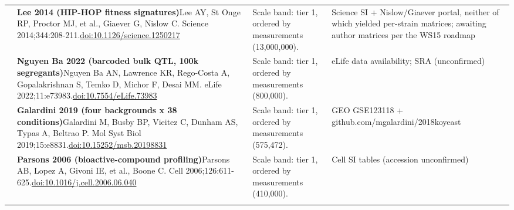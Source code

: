 \begin{landscape}
\begin{longtable}{@{}r@{\hspace{4pt}} L{86mm} L{92mm} L{62mm}@{}}
 & \textbf{Lee 2014 (HIP-HOP fitness signatures)}\newline Lee AY, St Onge RP, Proctor MJ, et al., Giaever G, Nislow C. Science 2014;344:208-211.\newline \href{https://doi.org/10.1126/science.1250217}{doi:10.1126/\allowbreak science.1250217} & Scale band: tier 1, ordered by measurements (13,000,000). & Science SI + Nislow/\allowbreak Giaever portal, neither of which yielded per-strain matrices; awaiting author matrices per the WS15 roadmap \\
 & \textbf{Nguyen Ba 2022 (barcoded bulk QTL, 100k segregants)}\newline Nguyen Ba AN, Lawrence KR, Rego-Costa A, Gopalakrishnan S, Temko D, Michor F, Desai MM. eLife 2022;11:e73983.\newline \href{https://doi.org/10.7554/eLife.73983}{doi:10.7554/\allowbreak eLife.73983} & Scale band: tier 1, ordered by measurements (800,000). & eLife data availability; SRA (unconfirmed) \\
 & \textbf{Galardini 2019 (four backgrounds x 38 conditions)}\newline Galardini M, Busby BP, Vieitez C, Dunham AS, Typas A, Beltrao P. Mol Syst Biol 2019;15:e8831.\newline \href{https://doi.org/10.15252/msb.20198831}{doi:10.15252/\allowbreak msb.20198831} & Scale band: tier 1, ordered by measurements (575,472). & GEO GSE123118 + github.com/\allowbreak mgalardini/\allowbreak 2018koyeast \\
 & \textbf{Parsons 2006 (bioactive-compound profiling)}\newline Parsons AB, Lopez A, Givoni IE, et al., Boone C. Cell 2006;126:611-625.\newline \href{https://doi.org/10.1016/j.cell.2006.06.040}{doi:10.1016/\allowbreak j.cell.2006.06.040} & Scale band: tier 1, ordered by measurements (410,000). & Cell SI tables (accession unconfirmed) \\
\addlinespace[5pt]
\end{longtable}
\endgroup
\end{landscape}
